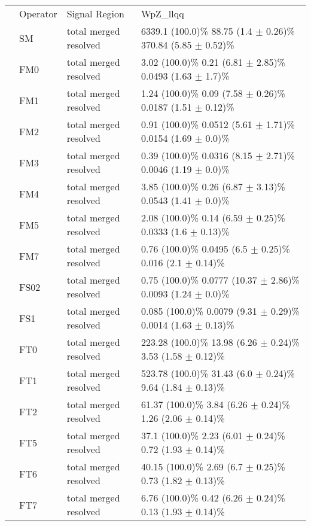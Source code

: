 \begin{tabular}{llll}
 & Operator & Signal Region & WpZ_llqq \\
 & SM & total
merged
resolved & 6339.1  (100.0)\%
88.75  (1.4 $\pm$ 0.26)\%
370.84  (5.85 $\pm$ 0.52)\% \\
 & FM0 & total
merged
resolved & 3.02  (100.0)\%
0.21  (6.81 $\pm$ 2.85)\%
0.0493  (1.63 $\pm$ 1.7)\% \\
 & FM1 & total
merged
resolved & 1.24  (100.0)\%
0.09  (7.58 $\pm$ 0.26)\%
0.0187  (1.51 $\pm$ 0.12)\% \\
 & FM2 & total
merged
resolved & 0.91  (100.0)\%
0.0512  (5.61 $\pm$ 1.71)\%
0.0154  (1.69 $\pm$ 0.0)\% \\
 & FM3 & total
merged
resolved & 0.39  (100.0)\%
0.0316  (8.15 $\pm$ 2.71)\%
0.0046  (1.19 $\pm$ 0.0)\% \\
 & FM4 & total
merged
resolved & 3.85  (100.0)\%
0.26  (6.87 $\pm$ 3.13)\%
0.0543  (1.41 $\pm$ 0.0)\% \\
 & FM5 & total
merged
resolved & 2.08  (100.0)\%
0.14  (6.59 $\pm$ 0.25)\%
0.0333  (1.6 $\pm$ 0.13)\% \\
 & FM7 & total
merged
resolved & 0.76  (100.0)\%
0.0495  (6.5 $\pm$ 0.25)\%
0.016  (2.1 $\pm$ 0.14)\% \\
 & FS02 & total
merged
resolved & 0.75  (100.0)\%
0.0777  (10.37 $\pm$ 2.86)\%
0.0093  (1.24 $\pm$ 0.0)\% \\
 & FS1 & total
merged
resolved & 0.085  (100.0)\%
0.0079  (9.31 $\pm$ 0.29)\%
0.0014  (1.63 $\pm$ 0.13)\% \\
 & FT0 & total
merged
resolved & 223.28  (100.0)\%
13.98  (6.26 $\pm$ 0.24)\%
3.53  (1.58 $\pm$ 0.12)\% \\
 & FT1 & total
merged
resolved & 523.78  (100.0)\%
31.43  (6.0 $\pm$ 0.24)\%
9.64  (1.84 $\pm$ 0.13)\% \\
 & FT2 & total
merged
resolved & 61.37  (100.0)\%
3.84  (6.26 $\pm$ 0.24)\%
1.26  (2.06 $\pm$ 0.14)\% \\
 & FT5 & total
merged
resolved & 37.1  (100.0)\%
2.23  (6.01 $\pm$ 0.24)\%
0.72  (1.93 $\pm$ 0.14)\% \\
 & FT6 & total
merged
resolved & 40.15  (100.0)\%
2.69  (6.7 $\pm$ 0.25)\%
0.73  (1.82 $\pm$ 0.13)\% \\
 & FT7 & total
merged
resolved & 6.76  (100.0)\%
0.42  (6.26 $\pm$ 0.24)\%
0.13  (1.93 $\pm$ 0.14)\% \\
\end{tabular}

